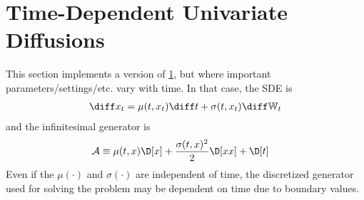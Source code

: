 \documentclass[11pt]{etk-article}
\begin{document}
\subsection{}

\section{Time-Dependent Univariate Diffusions}\label{sec:time-dependent-univariate-diffusion}
This section implements a version of \cref{sec:time-dependent-univariate-diffusion}, but where important parameters/settings/etc. vary with time.  In that case, the SDE is
\begin{align}
	\diff x_t = \mu(t, x_t)\diff t + \sigma(t, x_t)\diff\mathbb{W}_t\label{eq:x-t-SDE}
\end{align}
and the infinitesimal generator is 
\begin{align}
	\mathcal{A} &\equiv \mu(t,x)\D[x] + \frac{\sigma(t,x)^2}{2}\D[xx] + \D[t]\label{eq:A-generator-univariate-diffusion-t}
\end{align}
Even if the $\mu(\cdot)$ and $\sigma(\cdot)$ are independent of time, the discretized generator used for solving the problem may be dependent on time due to boundary values.



\end{document}
